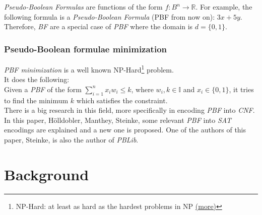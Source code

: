 \emph{Pseudo-Boolean Formulas} are functions of the form $f:B^n \rightarrow \mathbb{R}$. For example, the following formula is a \emph{Pseudo-Boolean Formula} (PBF from now on): $3x+5y$. Therefore, \emph{BF} are a special case of \emph{PBF} where the domain is $d=\{0,1\}$.\\



\subsubsection{Pseudo-Boolean formulae minimization}
\emph{PBF minimization} is a well known NP-Hard\footnote{NP-Hard: at least as hard as the hardest problems in NP \href{https://en.wikipedia.org/wiki/NP-hardness}{(more)}} problem. \\
It does the following:\\
Given a \emph{PBF} of the form $\sum_{i=1}^{n} x_{i}w_{i} \leq k$, where $w_{i},k \in \mathbb{I}$ and $x_{i} \in \{0,1\}$, it tries to find the minimum $k$ which satisfies the constraint.\\

There is a big research in this field, more specifically in encoding \emph{PBF} into \emph{CNF}. In this paper, Hölldobler, Manthey, Steinke\cite{Holldobler}, some relevant \emph{PBF} into \emph{SAT} encodings are explained and a new one is proposed. One of the authors of this paper, Steinke, is also the author of \emph{PBLib}.  

\section{Background}

